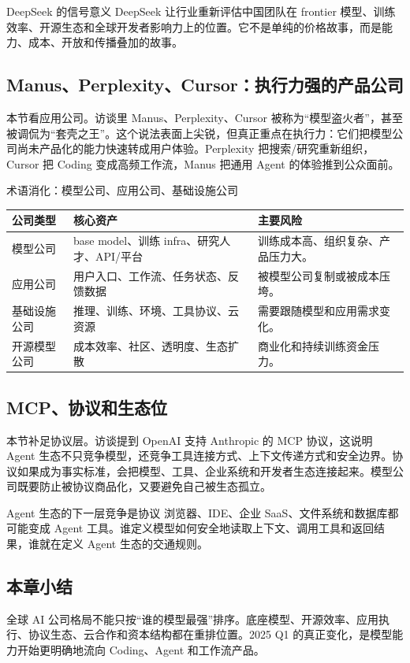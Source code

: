 \begin{importantbox}{DeepSeek 的信号意义}
DeepSeek 让行业重新评估中国团队在 frontier 模型、训练效率、开源生态和全球开发者影响力上的位置。它不是单纯的价格故事，而是能力、成本、开放和传播叠加的故事。
\end{importantbox}

\subsection{Manus、Perplexity、Cursor：执行力强的产品公司}

本节看应用公司。访谈里 Manus、Perplexity、Cursor 被称为“模型盗火者”，甚至被调侃为“套壳之王”。这个说法表面上尖锐，但真正重点在执行力：它们把模型公司尚未产品化的能力快速转成用户体验。Perplexity 把搜索/研究重新组织，Cursor 把 Coding 变成高频工作流，Manus 把通用 Agent 的体验推到公众面前。

\begin{knowledgebox}{术语消化：模型公司、应用公司、基础设施公司}
\noindent\begin{tabularx}{\textwidth}{p{}p{}X}
\toprule
公司类型 & 核心资产 & 主要风险 \\
\midrule
模型公司 & base model、训练 infra、研究人才、API/平台 & 训练成本高、组织复杂、产品压力大。 \\
应用公司 & 用户入口、工作流、任务状态、反馈数据 & 被模型公司复制或被成本压垮。 \\
基础设施公司 & 推理、训练、环境、工具协议、云资源 & 需要跟随模型和应用需求变化。 \\
开源模型公司 & 成本效率、社区、透明度、生态扩散 & 商业化和持续训练资金压力。 \\
\bottomrule
\end{tabularx}
\end{knowledgebox}

\subsection{MCP、协议和生态位}

本节补足协议层。访谈提到 OpenAI 支持 Anthropic 的 MCP 协议，这说明 Agent 生态不只竞争模型，还竞争工具连接方式、上下文传递方式和安全边界。协议如果成为事实标准，会把模型、工具、企业系统和开发者生态连接起来。模型公司既要防止被协议商品化，又要避免自己被生态孤立。

\begin{importantbox}{Agent 生态的下一层竞争是协议}
浏览器、IDE、企业 SaaS、文件系统和数据库都可能变成 Agent 工具。谁定义模型如何安全地读取上下文、调用工具和返回结果，谁就在定义 Agent 生态的交通规则。
\end{importantbox}

\subsection{本章小结}

全球 AI 公司格局不能只按“谁的模型最强”排序。底座模型、开源效率、应用执行、协议生态、云合作和资本结构都在重排位置。2025 Q1 的真正变化，是模型能力开始更明确地流向 Coding、Agent 和工作流产品。


